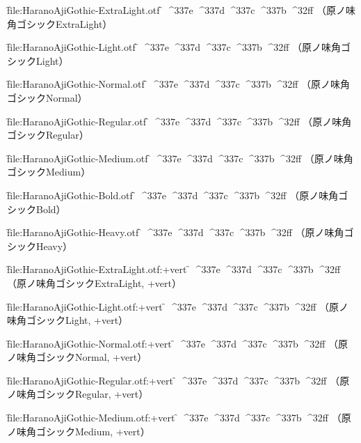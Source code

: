 

\nopagenumbers

\font\f{file:HaranoAjiGothic-ExtraLight.otf} \f
^^^^337e
^^^^337d
^^^^337c
^^^^337b
^^^^32ff
（原ノ味角ゴシックExtraLight）\par

\font\f{file:HaranoAjiGothic-Light.otf} \f
^^^^337e
^^^^337d
^^^^337c
^^^^337b
^^^^32ff
（原ノ味角ゴシックLight）\par

\font\f{file:HaranoAjiGothic-Normal.otf} \f
^^^^337e
^^^^337d
^^^^337c
^^^^337b
^^^^32ff
（原ノ味角ゴシックNormal）\par

\font\f{file:HaranoAjiGothic-Regular.otf} \f
^^^^337e
^^^^337d
^^^^337c
^^^^337b
^^^^32ff
（原ノ味角ゴシックRegular）\par

\font\f{file:HaranoAjiGothic-Medium.otf} \f
^^^^337e
^^^^337d
^^^^337c
^^^^337b
^^^^32ff
（原ノ味角ゴシックMedium）\par

\font\f{file:HaranoAjiGothic-Bold.otf} \f
^^^^337e
^^^^337d
^^^^337c
^^^^337b
^^^^32ff
（原ノ味角ゴシックBold）\par

\font\f{file:HaranoAjiGothic-Heavy.otf} \f
^^^^337e
^^^^337d
^^^^337c
^^^^337b
^^^^32ff
（原ノ味角ゴシックHeavy）\par


\font\f{file:HaranoAjiGothic-ExtraLight.otf:+vert} \f
^^^^337e
^^^^337d
^^^^337c
^^^^337b
^^^^32ff
（原ノ味角ゴシックExtraLight, +vert）\par

\font\f{file:HaranoAjiGothic-Light.otf:+vert} \f
^^^^337e
^^^^337d
^^^^337c
^^^^337b
^^^^32ff
（原ノ味角ゴシックLight, +vert）\par

\font\f{file:HaranoAjiGothic-Normal.otf:+vert} \f
^^^^337e
^^^^337d
^^^^337c
^^^^337b
^^^^32ff
（原ノ味角ゴシックNormal, +vert）\par

\font\f{file:HaranoAjiGothic-Regular.otf:+vert} \f
^^^^337e
^^^^337d
^^^^337c
^^^^337b
^^^^32ff
（原ノ味角ゴシックRegular, +vert）\par

\font\f{file:HaranoAjiGothic-Medium.otf:+vert} \f
^^^^337e
^^^^337d
^^^^337c
^^^^337b
^^^^32ff
（原ノ味角ゴシックMedium, +vert）\par


